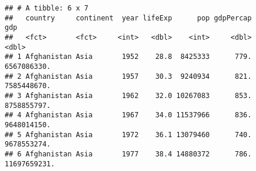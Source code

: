 \documentclass[
]{article}
\begin{document}
\begin{verbatim}
## # A tibble: 6 x 7
##   country     continent  year lifeExp      pop gdpPercap          gdp
##   <fct>       <fct>     <int>   <dbl>    <int>     <dbl>        <dbl>
## 1 Afghanistan Asia       1952    28.8  8425333      779.  6567086330.
## 2 Afghanistan Asia       1957    30.3  9240934      821.  7585448670.
## 3 Afghanistan Asia       1962    32.0 10267083      853.  8758855797.
## 4 Afghanistan Asia       1967    34.0 11537966      836.  9648014150.
## 5 Afghanistan Asia       1972    36.1 13079460      740.  9678553274.
## 6 Afghanistan Asia       1977    38.4 14880372      786. 11697659231.
\end{verbatim}
\end{document}
